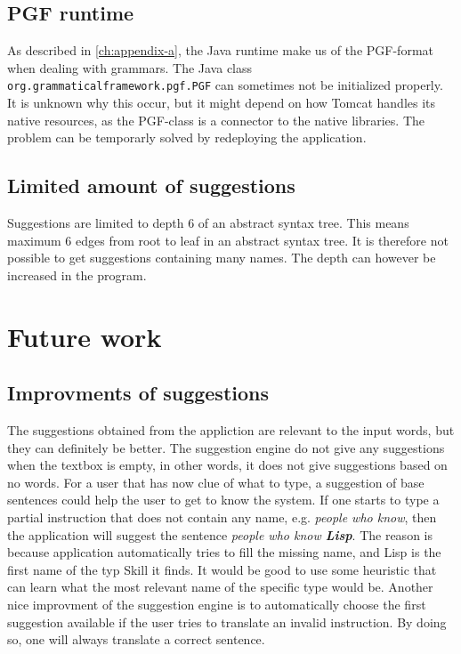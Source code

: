 \subsection*{PGF runtime}
As described in \autoref{ch:appendix-a}, the Java runtime make us of the PGF-format when dealing with grammars. The Java class \texttt{org.grammaticalframework.pgf.PGF} can sometimes not be initialized properly. It is unknown why this occur, but it might depend on how Tomcat handles its native resources, as the PGF-class is a connector to the native libraries. The problem can be temporarly solved by redeploying the application.

\subsection*{Limited amount of suggestions}
Suggestions are limited to depth 6 of an abstract syntax tree. This means maximum 6 edges from root to leaf in an abstract syntax tree. It is therefore not possible to get suggestions containing many names. The depth can however be increased in the program.

\section{Future work}
\subsection*{Improvments of suggestions}
The suggestions obtained from the appliction are relevant to the input words, but they can definitely be better. The suggestion engine do not give any suggestions when the textbox is empty, in other words, it does not give suggestions based on no words. For a user that has now clue of what to type, a suggestion of base sentences could help the user to get to know the system.
\newline
\newline
If one starts to type a partial instruction that does not contain any name, e.g. \emph{people who know}, then the application will suggest the sentence \emph{people who know \textbf{Lisp}}. The reason is because application automatically tries to fill the missing name, and Lisp is the first name of the typ Skill it finds. It would be good to use some heuristic that can learn what the most relevant name of the specific type would be.
\newline
\newline
Another nice improvment of the suggestion engine is to automatically choose the first suggestion available if the user tries to translate an invalid instruction. By doing so, one will always translate a correct sentence.

